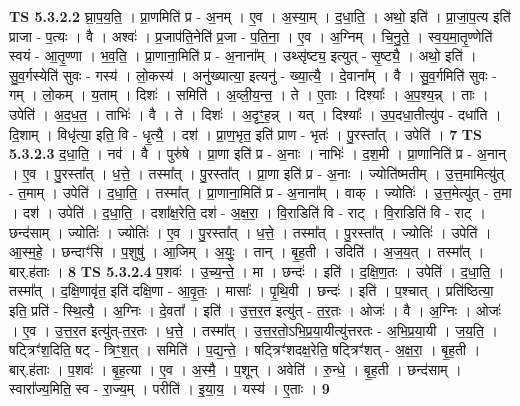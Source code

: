 \documentclass[17pt]{extarticle}
\begin{document}
                  \newline
                                \textbf{ TS 5.3.2.2} \newline
                  घ्रा॒प॒य॒ति॒ । प्रा॒णमिति॑ प्र - अ॒नम् । ए॒व । अ॒स्या॒म् । द॒धा॒ति॒ । अथो॒ इति॑ । प्रा॒जा॒प॒त्य इति॑ प्राजा - प॒त्यः । वै । अश्वः॑ । प्र॒जाप॑ति॒नेति॑ प्र॒जा - प॒ति॒ना॒ । ए॒व । अ॒ग्निम् । चि॒नु॒ते॒ । स्व॒य॒मा॒तृ॒ण्णेति॑ स्वयं - आ॒तृ॒ण्णा । भ॒व॒ति॒ । प्रा॒णाना॒मिति॑ प्र - अ॒नाना᳚म् । उथ्सृ॑ष्ट्य॒ इत्युत् - सृ॒ष्ट्यै॒ । अथो॒ इति॑ । सु॒व॒र्गस्येति॑ सुवः - गस्य॑ । लो॒कस्य॑ । अनु॑ख्यात्या॒ इत्यनु॑ - ख्या॒त्यै॒ । दे॒वाना᳚म् । वै । सु॒व॒र्गमिति॑ सुवः - गम् । लो॒कम् । य॒ताम् । दिशः॑ । समिति॑ । अ॒व्ली॒य॒न्त॒ । ते । ए॒ताः । दिश्याः᳚ । अ॒प॒श्य॒न्न् । ताः । उपेति॑ । अ॒द॒ध॒त॒ । ताभिः॑ । वै । ते । दिशः॑ । अ॒दृꣳ॒॒ह॒न्न् । यत् । दिश्याः᳚ । उ॒प॒दधा॒तीत्यु॑प - दधा॑ति । दि॒शाम् । विधृ॑त्या॒ इति॒ वि - धृ॒त्यै॒ । दश॑ । प्रा॒ण॒भृत॒ इति॑ प्राण - भृतः॑ । पु॒रस्ता᳚त् । उपेति॑ । \textbf{  7} \newline
                  \newline
                                \textbf{ TS 5.3.2.3} \newline
                  द॒धा॒ति॒ । नव॑ । वै । पुरु॑षे । प्रा॒णा इति॑ प्र - अ॒नाः । नाभिः॑ । द॒श॒मी । प्रा॒णानिति॑ प्र - अ॒नान् । ए॒व । पु॒रस्ता᳚त् । ध॒त्ते॒ । तस्मा᳚त् । पु॒रस्ता᳚त् । प्रा॒णा इति॑ प्र - अ॒नाः । ज्योति॑ष्मतीम् । उ॒त्त॒मामित्यु॑त् - त॒माम् । उपेति॑ । द॒धा॒ति॒ । तस्मा᳚त् । प्रा॒णाना॒मिति॑ प्र - अ॒नाना᳚म् । वाक् । ज्योतिः॑ । उ॒त्त॒मेत्यु॑त् - त॒मा । दश॑ । उपेति॑ । द॒धा॒ति॒ । दशा᳚क्ष॒रेति॒ दश॑ - अ॒क्ष॒रा॒ । वि॒राडिति॑ वि - राट् । वि॒राडिति॑ वि - राट् । छन्द॑साम् । ज्योतिः॑ । ज्योतिः॑ । ए॒व । पु॒रस्ता᳚त् । ध॒त्ते॒ । तस्मा᳚त् । पु॒रस्ता᳚त् । ज्योतिः॑ । उपेति॑ । आ॒स्म॒हे॒ । छन्दाꣳ॑सि । प॒शुषु॑ । आ॒जिम् । अ॒युः॒ । तान् । बृ॒ह॒ती । उदिति॑ । अ॒ज॒य॒त् । तस्मा᳚त् । बार्.ह॑ताः । \textbf{  8} \newline
                  \newline
                                \textbf{ TS 5.3.2.4} \newline
                  प॒शवः॑ । उ॒च्य॒न्ते॒ । मा । छन्दः॑ । इति॑ । द॒क्षि॒ण॒तः । उपेति॑ । द॒धा॒ति॒ । तस्मा᳚त् । द॒क्षि॒णावृ॑त॒ इति॑ दक्षि॒णा - आ॒वृ॒तः॒ । मासाः᳚ । पृ॒थि॒वी । छन्दः॑ । इति॑ । प॒श्चात् । प्रति॑ष्ठित्या॒ इति॒ प्रति॑ - स्थि॒त्यै॒ । अ॒ग्निः । दे॒वता᳚ । इति॑ । उ॒त्त॒र॒त इत्यु॑त् - त॒र॒तः । ओजः॑ । वै । अ॒ग्निः । ओजः॑ । ए॒व । उ॒त्त॒र॒त इत्यु॑त्-त॒र॒तः । ध॒त्ते॒ । तस्मा᳚त् । उ॒त्त॒र॒तो॒ऽभि॒प्र॒या॒यीत्यु॑त्तरतः - अ॒भि॒प्र॒या॒यी । ज॒य॒ति॒ । षट्त्रिꣳ॑श॒दिति॒ षट् - त्रिꣳ॒॒श॒त् । समिति॑ । प॒द्य॒न्ते॒ । षट्त्रिꣳ॑शदक्ष॒रेति॒ षट्त्रिꣳ॑शत् -   अ॒क्ष॒रा॒ । बृ॒ह॒ती । बार्.ह॑ताः । प॒शवः॑ । बृ॒ह॒त्या । ए॒व । अ॒स्मै॒ । प॒शून् । अवेति॑ । रु॒न्धे॒ । बृ॒ह॒ती । छन्द॑साम् । स्वारा᳚ज्य॒मिति॒ स्व - रा॒ज्य॒म् । परीति॑ । इ॒या॒य॒ । यस्य॑ । ए॒ताः । \textbf{  9} \newline
\end{document}
